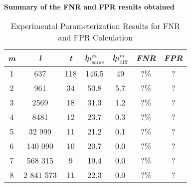 \textbf{Summary of the FNR and FPR results obtained}
\begin{table}[htbp] 
    \centering
    \begin{tabular}{|c|c|c|c|c|c|c|}
        \hline
        \textit{m} & \textit{l} & \textit{t} & \textit{l}\(\mu_{\text{same}}^m\) & \textit{l}\(\mu_{\text{diff}}^m\) & \textit{FNR} & \textit{FPR} \\
        \hline
        1 & 637 & 118 & 146.5 & 49 & ?\% & ? \\
        2 & 961 & 34 & 50.8 & 5.7 & ?\% & ? \\
        3 & 2569 & 18 & 31.3 & 1.2 & ?\% & ? \\
        4 & 8481 & 12 & 23.7 & 0.3 & ?\% & ? \\
        5 & 32 999 & 11 & 21.2 & 0.1 & ?\% & ? \\
        6 & 140 090 & 10 & 20.7 & 0.0 & ?\% & ? \\
        7 & 568 315 & 9 & 19.4 & 0.0 & ?\% & ? \\
        8 & 2 841 573 & 11 & 22.3 & 0.0 & ?\% & ? \\
        \hline
    \end{tabular}
    \caption{Experimental Parameterization Results for FNR and FPR Calculation}
    \label{tab:experimental_parameterization}
\end{table}

\newpage
